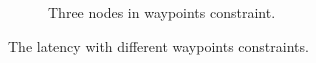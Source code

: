 \begin{figure}[!htbp]
\begin{subfigure}{0.48\linewidth}
      \caption{\label{fig:eval4} \small Three nodes in waypoints constraint.}
\end{subfigure}
\vspace{-2mm}
\caption{\small The latency with different waypoints constraints.}
\label{fig:eval34}
\end{figure}



%
%
%
%
%
%
%
%
%
